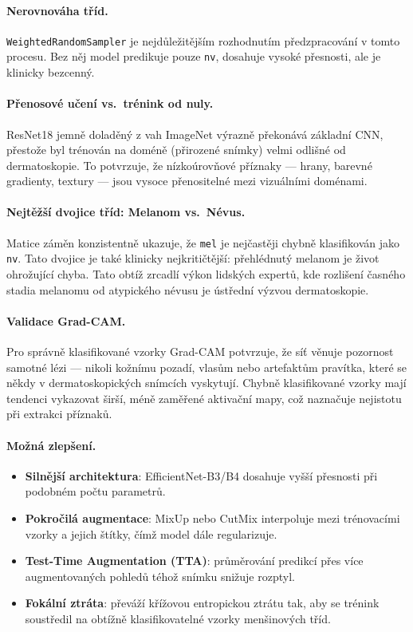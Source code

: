 \documentclass[12pt, a4paper]{article}
\begin{document}
\paragraph{Nerovnováha tříd.}
\texttt{WeightedRandomSampler} je nejdůležitějším rozhodnutím
předzpracování v tomto procesu. Bez něj model predikuje pouze
\texttt{nv}, dosahuje vysoké přesnosti, ale je klinicky bezcenný.

\paragraph{Přenosové učení vs.\ trénink od nuly.}
ResNet18 jemně doladěný z vah ImageNet výrazně překonává základní CNN,
přestože byl trénován na doméně (přirozené snímky) velmi odlišné od
dermatoskopie. To potvrzuje, že nízkoúrovňové příznaky --- hrany,
barevné gradienty, textury --- jsou vysoce přenositelné mezi vizuálními
doménami.

\paragraph{Nejtěžší dvojice tříd: Melanom vs.\ Névus.}
Matice záměn konzistentně ukazuje, že \texttt{mel} je nejčastěji chybně
klasifikován jako \texttt{nv}. Tato dvojice je také klinicky
nejkritičtější: přehlédnutý melanom je život ohrožující chyba.
Tato obtíž zrcadlí výkon lidských expertů, kde rozlišení časného stadia
melanomu od atypického névusu je ústřední výzvou dermatoskopie.

\paragraph{Validace Grad-CAM.}
Pro správně klasifikované vzorky Grad-CAM potvrzuje, že síť věnuje
pozornost samotné lézi --- nikoli kožnímu pozadí, vlasům nebo artefaktům
pravítka, které se někdy v dermatoskopických snímcích vyskytují.
Chybně klasifikované vzorky mají tendenci vykazovat širší, méně zaměřené
aktivační mapy, což naznačuje nejistotu při extrakci příznaků.

\paragraph{Možná zlepšení.}
\begin{itemize}
    \item \textbf{Silnější architektura}: EfficientNet-B3/B4 dosahuje
          vyšší přesnosti při podobném počtu parametrů.
    \item \textbf{Pokročilá augmentace}: MixUp nebo CutMix interpoluje
          mezi trénovacími vzorky a jejich štítky, čímž model dále
          regularizuje.
    \item \textbf{Test-Time Augmentation (TTA)}: průměrování predikcí
          přes více augmentovaných pohledů téhož snímku snižuje rozptyl.
    \item \textbf{Fokální ztráta}: převáží křížovou entropickou ztrátu
          tak, aby se trénink soustředil na obtížně klasifikovatelné
          vzorky menšinových tříd.
\end{itemize}
\end{document}
